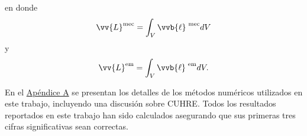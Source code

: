\noindent
en donde
%
\begin{equation}
\vv{L}^\text{mec}
=
\int_V \vvb{\ell}^\text{ mec} dV
\label{Lmech}
\end{equation}
%
y
%
\begin{equation}
\vv{L}^\text{em}
=
\int_V \vvb{\ell}^\text{ em} dV
\label{Lem}.
\end{equation}
%

En el \hyperlink{AppendixCubatures}{Apéndice A} se presentan los detalles de los métodos numéricos utilizados en este trabajo, incluyendo una discusión sobre CUHRE. Todos los resultados reportados en este trabajo han sido calculados asegurando que sus primeras tres cifras significativas sean correctas.

